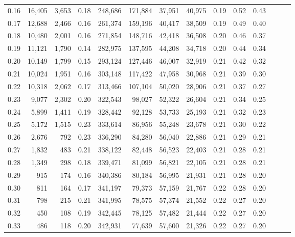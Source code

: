 \begin{tabular}{rrrrrrrrrrrrrr}
0.16 &  16,405 &  3,653 &  0.18 &  248,686 &  171,884 &  37,951 &  40,975 &  0.19 &  0.52 &      0.43 \\
0.17 &  12,688 &  2,466 &  0.16 &  261,374 &  159,196 &  40,417 &  38,509 &  0.19 &  0.49 &      0.40 \\
0.18 &  10,480 &  2,001 &  0.16 &  271,854 &  148,716 &  42,418 &  36,508 &  0.20 &  0.46 &      0.37 \\
0.19 &  11,121 &  1,790 &  0.14 &  282,975 &  137,595 &  44,208 &  34,718 &  0.20 &  0.44 &      0.34 \\
0.20 &  10,149 &  1,799 &  0.15 &  293,124 &  127,446 &  46,007 &  32,919 &  0.21 &  0.42 &      0.32 \\
0.21 &  10,024 &  1,951 &  0.16 &  303,148 &  117,422 &  47,958 &  30,968 &  0.21 &  0.39 &      0.30 \\
0.22 &  10,318 &  2,062 &  0.17 &  313,466 &  107,104 &  50,020 &  28,906 &  0.21 &  0.37 &      0.27 \\
0.23 &   9,077 &  2,302 &  0.20 &  322,543 &   98,027 &  52,322 &  26,604 &  0.21 &  0.34 &      0.25 \\
0.24 &   5,899 &  1,411 &  0.19 &  328,442 &   92,128 &  53,733 &  25,193 &  0.21 &  0.32 &      0.23 \\
0.25 &   5,172 &  1,515 &  0.23 &  333,614 &   86,956 &  55,248 &  23,678 &  0.21 &  0.30 &      0.22 \\
0.26 &   2,676 &    792 &  0.23 &  336,290 &   84,280 &  56,040 &  22,886 &  0.21 &  0.29 &      0.21 \\
0.27 &   1,832 &    483 &  0.21 &  338,122 &   82,448 &  56,523 &  22,403 &  0.21 &  0.28 &      0.21 \\
0.28 &   1,349 &    298 &  0.18 &  339,471 &   81,099 &  56,821 &  22,105 &  0.21 &  0.28 &      0.21 \\
0.29 &     915 &    174 &  0.16 &  340,386 &   80,184 &  56,995 &  21,931 &  0.21 &  0.28 &      0.20 \\
0.30 &     811 &    164 &  0.17 &  341,197 &   79,373 &  57,159 &  21,767 &  0.22 &  0.28 &      0.20 \\
0.31 &     798 &    215 &  0.21 &  341,995 &   78,575 &  57,374 &  21,552 &  0.22 &  0.27 &      0.20 \\
0.32 &     450 &    108 &  0.19 &  342,445 &   78,125 &  57,482 &  21,444 &  0.22 &  0.27 &      0.20 \\
0.33 &     486 &    118 &  0.20 &  342,931 &   77,639 &  57,600 &  21,326 &  0.22 &  0.27 &      0.20 \\

\end{tabular}
